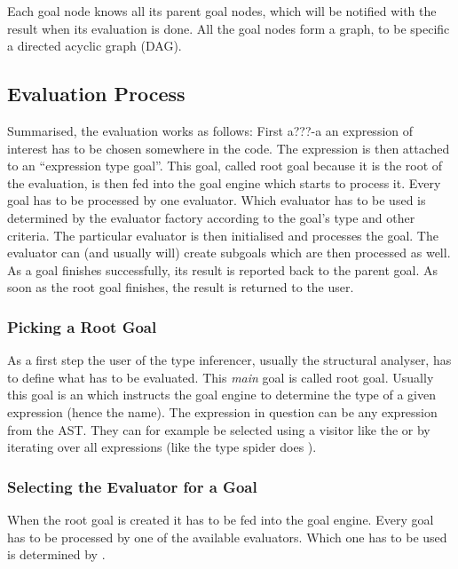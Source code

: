 \documentclass[12pt,halfparskip,DIV11,BCOR10mm]{scrreprt}
\begin{document}
Each goal node knows all its parent goal nodes, which will be notified with the result when its evaluation is done. All the goal nodes form a graph, to be specific a directed acyclic graph (DAG).




\subsection{Evaluation Process}

Summarised, the evaluation works as follows: First a???-a an expression of interest has to be chosen somewhere in the code. The expression is then attached to an ``expression type goal''. This goal, called root goal because it is the root of the evaluation, is then fed into the goal engine which starts to process it. Every goal has to be processed by one evaluator. Which evaluator has to be used is determined by the evaluator factory according to the goal's type and other criteria. The particular evaluator is then initialised and processes the goal. The evaluator can (and usually will) create subgoals which are then processed as well. As a goal finishes successfully, its result is reported back to the parent goal. As soon as the root goal finishes, the result is returned to the user.

\subsubsection{Picking a Root Goal}

As a first step the user of the type inferencer, usually the structural analyser, has to define what has to be evaluated. This \emph{main} goal is called root goal. Usually this goal is an  which instructs the goal engine to determine the type of a given expression (hence the name). The expression in question can be any expression from the AST. They can for example be selected using a visitor like the  or by iterating over all expressions (like the type spider does ).

\subsubsection{Selecting the Evaluator for a Goal}

When the root goal is created it has to be fed into the goal engine. Every goal has to be processed by one of the available evaluators. Which one has to be used is determined by .
\end{document}
